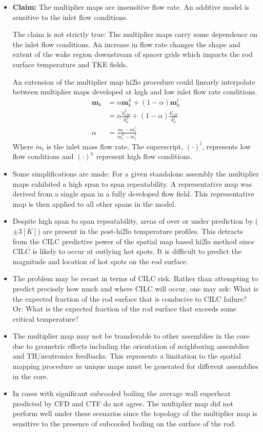     \begin{itemize}
    \item \textbf{Claim:} The multiplier maps are insensitive flow rate.  An additive model is sensitive to the inlet flow conditions.

     The claim is not strictly true: The multiplier maps carry some dependence on the inlet flow conditions.  An increase in flow rate changes the shape and extent of the wake region downstream of spacer grids which impacts the rod surface temperature and TKE fields.

    An extension of the multiplier map hi2lo procedure could linearly interpolate between multiplier maps developed at high and low inlet flow rate conditions.
    \begin{align*}
        \mathbf m_k &= \alpha \mathbf m_k^h + (1 - \alpha) \mathbf m_k^l \\
                    &= \alpha \frac{k^h_{cfd}}{k^h_0} + (1 - \alpha) \frac{k^l_{cfd}}{k^l_0} \\
        \alpha & = \frac{\dot m_i - \dot m_i^l }{\dot m_i^h - \dot m_i^l}
    \end{align*}
    Where $\dot m_i$ is the inlet mass flow rate.  The superscript, $(\cdot)^l$, represents low flow conditions and $(\cdot)^h$ represent high flow conditions.
     \item Some simplifications are made:  For a given standalone assembly the multiplier maps exhibited a high span to span repeatability.  A representative map was derived from a single span in a fully developed flow field.  This representative map is then applied to all other spans in the model.
     \item Despite high span to span repeatability, areas of over or under prediction by ($\pm 3[K]$)  are present in the post-hi2lo temperature profiles.  This detracts from the CILC predictive power of the spatial map based hi2lo method since CILC is likely to occur at outlying hot spots.  It is difficult to predict the magnitude and location of hot spots on the rod surface.
     \item The problem may be recast in terms of CILC risk.  Rather than attempting to predict precisely how much and where CILC will occur, one may ask: 
         What is the expected fraction of the rod surface that is conducive to CILC failure?  Or:
         What is the expected fraction of the rod surface that exceeds some critical temperature?
     \item The multiplier map may not be transferable to other assemblies in the core due to geometric effects including the orientation of neighboring assemblies and TH/neutronics feedbacks.  This represents a limitation to the spatial mapping procedure as unique maps must be generated for different assemblies in the core.
     \item In cases with significant subcooled boiling the average wall superheat predicted by CFD and CTF do not agree.
        The multiplier map did not perform well under these scenarios since the topology of the multiplier map is sensitive to the presence of subcooled boiling on the surface of the rod.
    \end{itemize}
